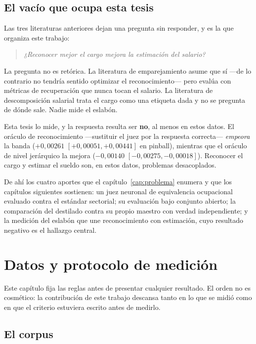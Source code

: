 \documentclass[12pt,a4paper,oneside]{report}
\begin{document}
\section{El vacío que ocupa esta tesis}
\label{sec:vacio}

Las tres literaturas anteriores dejan una pregunta sin responder, y es la que organiza
este trabajo:

\begin{quote}
\emph{¿Reconocer mejor el cargo mejora la estimación del salario?}
\end{quote}

La pregunta no es retórica. La literatura de emparejamiento asume que sí —de lo contrario
no tendría sentido optimizar el reconocimiento— pero evalúa con métricas de recuperación
que nunca tocan el salario. La literatura de descomposición salarial trata el cargo como
una etiqueta dada y no se pregunta de dónde sale. Nadie mide el eslabón.

Esta tesis lo mide, y la respuesta resulta ser \textbf{no}, al menos en estos datos. El
oráculo de reconocimiento —sustituir el juez por la respuesta correcta— \emph{empeora} la
banda ($+0{,}00261$ $[+0{,}00051, +0{,}00441]$ en pinball), mientras que el oráculo de
nivel jerárquico la mejora ($-0{,}00140$ $[-0{,}00275, -0{,}00018]$).
Reconocer el cargo y estimar el sueldo son, en estos datos, problemas desacoplados.

De ahí los cuatro aportes que el capítulo~\ref{cap:problema} enumera y que los capítulos
siguientes sostienen: un juez neuronal de equivalencia ocupacional evaluado contra el
estándar sectorial; su evaluación bajo conjunto abierto; la comparación del destilado
contra su propio maestro con verdad independiente; y la medición del eslabón que une
reconocimiento con estimación, cuyo resultado negativo es el hallazgo central.

\chapter{Datos y protocolo de medición}
\label{cap:protocolo}

Este capítulo fija las reglas antes de presentar cualquier resultado. El orden no es
cosmético: la contribución de este trabajo descansa tanto en lo que se midió como en que
el criterio estuviera escrito antes de medirlo.

\section{El corpus}
\end{document}
